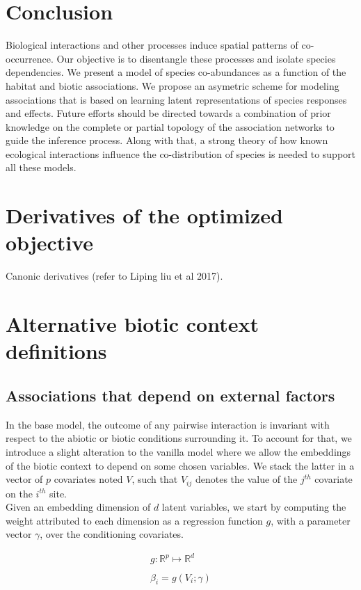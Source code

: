 \documentclass[]{article}
\begin{document}
 
\section{Conclusion}
Biological interactions and other processes induce spatial patterns of co-occurrence. Our objective is to disentangle these processes and isolate species dependencies. We present a model of species co-abundances as a function of the habitat and biotic associations. We propose an asymetric scheme for modeling associations that is based on learning latent representations of species responses and effects. Future efforts should be directed towards a combination of prior knowledge on the complete or partial topology of the association networks to guide the inference process. Along with that, a strong theory of how known ecological interactions influence the co-distribution of species is needed to support all these models.   

\appendix

\section{Derivatives of the optimized objective}
Canonic derivatives (refer to Liping liu et al 2017). 

\section{Alternative biotic context definitions}
\subsection{Associations that depend on external factors}
In the base model, the outcome of any pairwise interaction is invariant with respect to the abiotic or biotic conditions surrounding it. To account for that, we introduce a slight alteration to the vanilla model where we allow the embeddings of the biotic context to depend on some chosen variables. We stack the latter in a vector of $p$ covariates noted $V$, such that $V_{ij}$ denotes the value of the $j^{th}$ covariate on the $i^{th}$ site. \\

\noindent Given an embedding dimension of $d$ latent variables, we start by computing the weight attributed to each dimension as a regression function $g$, with a parameter vector $\gamma$, over the conditioning covariates.      

\begin{equation*}
\begin{matrix}
g: \mathbb{R}^p \mapsto \mathbb{R}^d \\\\
\beta_i=g(V_i ; \gamma)
\end{matrix}
\end{equation*}
\end{document}
